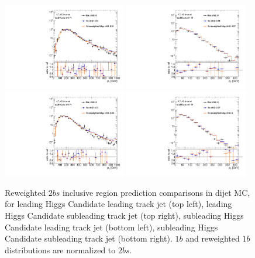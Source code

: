 \begin{figure}[htbp!]
\begin{center}
\includegraphics[width=0.48\textwidth,angle=-90]{figures/boosted/AppendixReweight/Compare/Dijet_Incl_directcompare_leadHCand_trk0_Pt_1.pdf}
\includegraphics[width=0.48\textwidth,angle=-90]{figures/boosted/AppendixReweight/Compare/Dijet_Incl_directcompare_leadHCand_trk1_Pt_1.pdf}\\
\includegraphics[width=0.48\textwidth,angle=-90]{figures/boosted/AppendixReweight/Compare/Dijet_Incl_directcompare_sublHCand_trk0_Pt_1.pdf}
\includegraphics[width=0.48\textwidth,angle=-90]{figures/boosted/AppendixReweight/Compare/Dijet_Incl_directcompare_sublHCand_trk1_Pt_1.pdf}\\
\caption{Reweighted $2bs$ inclusive region prediction comparisons in dijet MC, for leading Higgs Candidate leading track jet \pt (top left),  leading Higgs Candidate subleading track jet \pt (top right), subleading Higgs Candidate leading track jet \pt (bottom left), subleading Higgs Candidate subleading track jet \pt (bottom right). $1b$ and reweighted $1b$ distributions are normalized to $2bs$.}
\label{fig:app-rw-comp-dijet-2bs-trkjet}
\end{center}
\end{figure}


